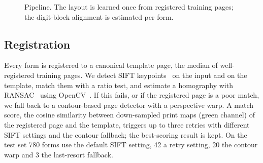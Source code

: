 \documentclass{article}
\begin{document}
\begin{figure}[t]
\centering
{}
\caption{Pipeline. The layout is learned once from registered training pages; the digit-block
alignment is estimated per form.}
\label{fig:pipeline}
\end{figure}

\subsection{Registration}
Every form is registered to a canonical template page, the median of well-registered training
pages. We detect SIFT keypoints~\citep{lowe2004} on the input and on the template, match them with
a ratio test, and estimate a homography with RANSAC~\citep{fischler1981,hartley2004} using
OpenCV~\citep{bradski2000}. If this fails, or if the registered page is a poor match, we fall
back to a contour-based page detector with a perspective warp. A match score,
the cosine similarity between down-sampled print maps (green channel) of the registered page and
the template, triggers up to three retries with different SIFT settings and the contour fallback;
the best-scoring result is kept. On the test set 780 forms use the default SIFT setting, 42 a
retry setting, 20 the contour warp and 3 the last-resort fallback.
\end{document}
